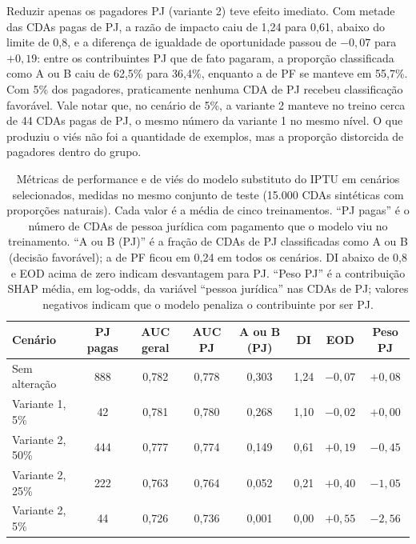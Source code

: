 Reduzir apenas os pagadores PJ (variante 2) teve efeito imediato. Com metade das CDAs pagas de PJ, a razão de impacto caiu de 1,24 para 0,61, abaixo do limite de 0,8, e a diferença de igualdade de oportunidade passou de $-0{,}07$ para $+0{,}19$: entre os contribuintes PJ que de fato pagaram, a proporção classificada como A ou B caiu de 62,5\% para 36,4\%, enquanto a de PF se manteve em 55,7\%. Com 5\% dos pagadores, praticamente nenhuma CDA de PJ recebeu classificação favorável. Vale notar que, no cenário de 5\%, a variante 2 manteve no treino cerca de 44 CDAs pagas de PJ, o mesmo número da variante 1 no mesmo nível. O que produziu o viés não foi a quantidade de exemplos, mas a proporção distorcida de pagadores dentro do grupo.

\begin{table}[H]
    \centering
    \caption[Métricas de performance e de viés do modelo substituto em cenários selecionados]{Métricas de performance e de viés do modelo substituto do IPTU em cenários selecionados, medidas no mesmo conjunto de teste (15.000 CDAs sintéticas com proporções naturais). Cada valor é a média de cinco treinamentos. ``PJ pagas'' é o número de CDAs de pessoa jurídica com pagamento que o modelo viu no treinamento. ``A ou B (PJ)'' é a fração de CDAs de PJ classificadas como A ou B (decisão favorável); a de PF ficou em 0,24 em todos os cenários. DI abaixo de 0,8 e EOD acima de zero indicam desvantagem para PJ. ``Peso PJ'' é a contribuição SHAP média, em log-odds, da variável ``pessoa jurídica'' nas CDAs de PJ; valores negativos indicam que o modelo penaliza o contribuinte por ser PJ.}
    \label{tab:desbalanceamento}
    \small
    \renewcommand{\arraystretch}{1.2}
    \begin{tabularx}{\textwidth}{>{\raggedright\arraybackslash}p{2.8cm}CCCCCCC}
        \toprule
        \textbf{Cenário} & \textbf{PJ pagas} & \textbf{AUC geral} & \textbf{AUC PJ} & \textbf{A ou B (PJ)} & \textbf{DI} & \textbf{EOD} & \textbf{Peso PJ} \\
        \midrule
        Sem alteração    & 888 & 0,782 & 0,778 & 0,303 & 1,24 & $-0{,}07$ & $+0{,}08$ \\
        Variante 1, 5\%  &  42 & 0,781 & 0,780 & 0,268 & 1,10 & $-0{,}02$ & $+0{,}00$ \\
        Variante 2, 50\% & 444 & 0,777 & 0,774 & 0,149 & 0,61 & $+0{,}19$ & $-0{,}45$ \\
        Variante 2, 25\% & 222 & 0,763 & 0,764 & 0,052 & 0,21 & $+0{,}40$ & $-1{,}05$ \\
        Variante 2, 5\%  &  44 & 0,726 & 0,736 & 0,001 & 0,00 & $+0{,}55$ & $-2{,}56$ \\
        \bottomrule
    \end{tabularx}
\end{table}

